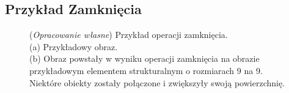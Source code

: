 \documentclass{article}
\begin{document}
    \subsection{Przykład Zamknięcia}
    \begin{figure}[H]
        \centering
        \qquad
        \caption
        {
            (\textit{Opracowanie własne}) Przykład operacji zamknięcia.\\
            (a) Przykładowy obraz.\\
            (b) Obraz powstały w wyniku operacji zamknięcia na obrazie przykładowym elementem strukturalnym o rozmiarach 9 na 9.
            Niektóre obiekty zostały połączone i zwiększyły swoją powierzchnię.
        }
    \end{figure}
\end{document}
